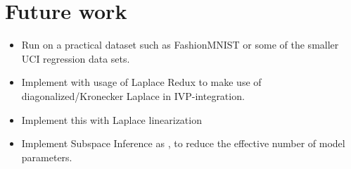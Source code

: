 \section{Future work}
\begin{itemize}
    \item Run on a practical dataset such as FashionMNIST or some of the smaller UCI regression data sets.
    \item Implement with usage of Laplace Redux \cite{daxberger2022laplacereduxeffortless} to make use of diagonalized/Kronecker Laplace in IVP-integration.
    \item Implement this with Laplace linearization
    \item Implement Subspace Inference as \cite{pmlr-v115-izmailov20a}, to reduce the effective number of model parameters.
\end{itemize}